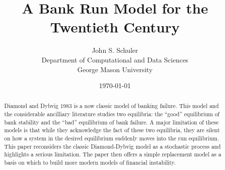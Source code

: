 \documentclass[12pt]{article}
\title{A Bank Run Model for the Twentieth Century}
\author{John S. Schuler \\ Department of Computational and Data Sciences \\ George Mason University}
\date{\today}
\begin{document}

\maketitle
\begin{abstract}
	Diamond and Dybvig 1983 is a now classic model of banking failure. This model and the considerable ancilliary literature studies two equilibria: the ``good'' equilibrium of bank stability and the ``bad'' equilibrium of bank failure. A major limitation of these models is that while they acknowledge the fact of these two equilibria, they are silent on how a system in the desired equilibrium suddenly moves into the run equilibrium. This paper reconsiders the classic Diamond-Dybvig model as a stochastic process and highlights a serious limitation. The paper then offers a simple replacement model as a basis on which to build more modern models of financial instability. 
\end{abstract}
\end{document}
